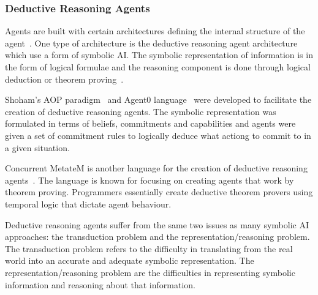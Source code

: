 \documentclass[]{final_report}
\begin{document}
\subsubsection{Deductive Reasoning Agents}
Agents are built with certain architectures defining the internal structure of the agent~\cite{Maes:1991:ANA:122344.122367}. One type of architecture is the deductive reasoning agent architecture which use a form of symbolic AI. The symbolic representation of information is in the form of logical formulae and the reasoning component is done through logical deduction or theorem proving~\cite{wooldridge2009introduction}.\par 
Shoham's AOP paradigm~\cite{shoham1993agent} and Agent0 language~\cite{shoham1991agent0} were developed to facilitate the creation of deductive reasoning agents. The symbolic representation was formulated in terms of beliefs, commitments and capabilities and agents were given a set of commitment rules to logically deduce what actiong to commit to in a given situation.\par 
Concurrent MetateM is another language for the creation of deductive reasoning agents~\cite{fisher1993concurrent}.  The language is known for focusing on creating agents that work by theorem proving. Programmers essentially create deductive theorem provers using temporal logic that dictate agent behaviour.\par 
Deductive reasoning agents suffer from the same two issues as many symbolic AI approaches: the transduction problem and the representation/reasoning problem. The transduction problem refers to the difficulty in translating from the real world into an accurate and adequate symbolic representation. The representation/reasoning problem are the difficulties in representing symbolic information and reasoning about that information.
\end{document}
